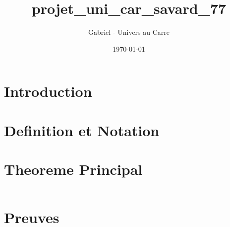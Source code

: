 \documentclass[12pt]{article}
\title{projet_uni_car_savard_77}
\author{Gabriel - Univers au Carre}
\date{\today}
\begin{document}
\maketitle


\section{Introduction}



\section{Definition et Notation}



\section{Theoreme Principal}


\begin{equation}
\end{equation}


\section{Preuves}


\end{document}
